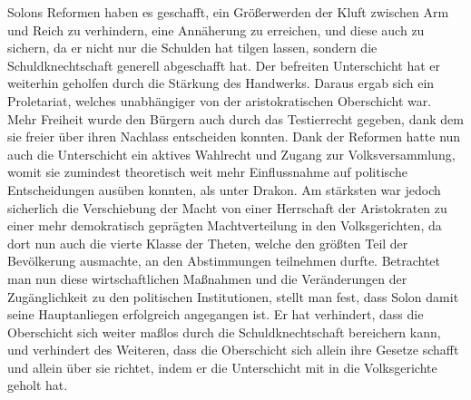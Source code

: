 \documentclass{article}
\begin{document}
Solons Reformen haben es geschafft, ein Größerwerden der Kluft zwischen Arm und Reich zu verhindern, eine Annäherung zu erreichen, und diese auch zu sichern, da er nicht nur die Schulden hat tilgen lassen, sondern die Schuldknechtschaft generell abgeschafft hat. Der befreiten Unterschicht hat er weiterhin geholfen durch die Stärkung des Handwerks. Daraus ergab sich ein Proletariat, welches unabhängiger von der aristokratischen Oberschicht war. Mehr Freiheit wurde den Bürgern auch durch das Testierrecht gegeben, dank dem sie freier über ihren Nachlass entscheiden konnten. Dank der Reformen hatte nun auch die Unterschicht ein aktives Wahlrecht und Zugang zur Volksversammlung, womit sie zumindest theoretisch weit mehr Einflussnahme auf politische Entscheidungen ausüben konnten, als unter Drakon. Am stärksten war jedoch sicherlich die Verschiebung der Macht von einer Herrschaft der Aristokraten zu einer mehr demokratisch geprägten Machtverteilung in den Volksgerichten, da dort nun auch die vierte Klasse der Theten, welche den größten Teil der Bevölkerung ausmachte, an den Abstimmungen teilnehmen durfte. Betrachtet man nun diese wirtschaftlichen Maßnahmen und die Veränderungen der Zugänglichkeit zu den politischen Institutionen, stellt man fest, dass Solon damit seine Hauptanliegen erfolgreich angegangen ist. Er hat verhindert, dass die Oberschicht sich weiter maßlos durch die Schuldknechtschaft bereichern kann, und verhindert des Weiteren, dass die Oberschicht sich allein ihre Gesetze schafft und allein über sie richtet, indem er die Unterschicht mit in die Volksgerichte geholt hat.  \\
\end{document}
